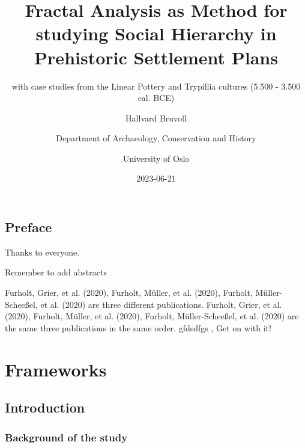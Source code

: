 \documentclass[
  12pt,
]{book}
\title{Fractal Analysis as Method for studying Social Hierarchy in Prehistoric Settlement Plans}
\subtitle{with case studies from the Linear Pottery and Trypillia cultures (5.500 - 3.500 cal. BCE)}
\author{Hallvard Bruvoll \and Department of Archaeology, Conservation and History \and University of Oslo}
\date{2023-06-21}
\begin{document}
\maketitle

{
\setcounter{tocdepth}{1}
\tableofcontents
}
\hypertarget{preface}{%
\chapter*{Preface}\label{preface}}

Thanks to everyone.

Remember to add abstracts

Furholt, Grier, et al. (2020), Furholt, Müller, et al. (2020), Furholt, Müller-Scheeßel, et al. (2020) are three different publications. Furholt, Grier, et al. (2020), Furholt, Müller, et al. (2020), Furholt, Müller-Scheeßel, et al. (2020) are the same three publications in the same order. gfdsdfgs , Get on with it!

\hypertarget{part-frameworks}{%
\part{Frameworks}\label{part-frameworks}}

\hypertarget{intro}{%
\chapter{Introduction}\label{intro}}

\hypertarget{background-of-the-study}{%
\section{Background of the study}\label{background-of-the-study}}
\end{document}
